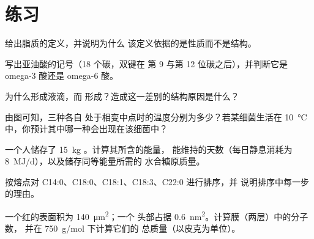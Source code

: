 \section{练习}

\begin{exercise}[$\star$]\label{exo:b1:lipids:1}
给出脂质的定义，并说明为什么
该定义依据的是性质而不是结构。
\end{exercise}

\begin{exercise}[$\star$]\label{exo:b1:lipids:2}
写出亚油酸的记号（18 个碳，双键在
第 9 与第 12 位碳之后），并判断它是 omega-3 酸还是 omega-6 酸。
\end{exercise}

\begin{exercise}[$\star$]\label{exo:b1:lipids:3}
为什么形成液滴，而
形成？造成这一差别的结构原因是什么？
\end{exercise}

\begin{exercise}[$\star$]\label{exo:b1:lipids:4}
由图可知，三种各自
处于相变中点时的温度分别为多少？若某细菌生活在
\qty{10}{\celsius} 中，你预计其中哪一种会出现在该细菌中？
\end{exercise}

\begin{exercise}[$\star\star$]\label{exo:b1:lipids:5}
一个人储存了 \qty{15}{kg} 。计算其所含的能量，
能维持的天数（每日静息消耗为
\qty{8}{MJ/d}），以及储存同等能量所需的
水合糖原质量。
\end{exercise}

\begin{exercise}[$\star\star$]\label{exo:b1:lipids:6}
按熔点对 C14:0、C18:0、C18:1、C18:3、C22:0 进行排序，并
说明排序中每一步的理由。
\end{exercise}

\begin{exercise}[$\star\star$]\label{exo:b1:lipids:7}
一个红的表面积为 \qty{140}{\micro m^2}；一个
头部占据 \qty{0.6}{nm^2}。计算膜（两层）中的分子数，
并在 \qty{750}{g/mol} 下计算它们的
总质量（以皮克为单位）。
\end{exercise}

